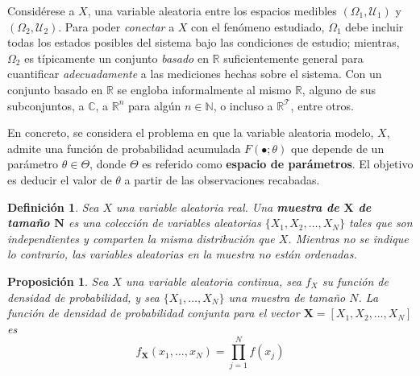 \documentclass[12pt,letterpaper]{book}
\newtheorem{definicion}{Definición}[chapter]
\newtheorem{proposicion}[teorema]{Proposición}
\newcommand{\R}{\mathbb{R}}
\newcommand{\C}{\mathbb{C}}
\newcommand{\N}{\mathbb{N}}
\begin{document}

Considérese a $X$, una variable aleatoria entre los espacios medibles $(\Omega_1,\mathcal{U}_1)$ y $(\Omega_2,\mathcal{U}_2)$. 
%
Para poder \textit{conectar} a $X$ con el fenómeno estudiado, $\Omega_1$ debe incluir todas los estados posibles del sistema bajo las condiciones de estudio; mientras, $\Omega_2$ es típicamente un conjunto \textit{basado} en $\R$ suficientemente general para cuantificar \textit{adecuadamente} a las mediciones hechas sobre el sistema.
%
Con un conjunto basado en $\R$ se engloba informalmente al mismo $\R$, alguno de sus subconjuntos, a $\C$, a $\R^n$ para algún $n\in \N$, o incluso a $\R^\mathcal{T}$, entre otros.

En concreto, se considera el problema en que la variable aleatoria modelo, $X$, admite una función de probabilidad acumulada $F(\bullet; \theta)$ que depende de un parámetro $\theta \in \Theta$, donde $\Theta$ es referido como \textbf{espacio de parámetros}.
%
El objetivo es deducir el valor de $\theta$ a partir de las observaciones recabadas.

\begin{definicion}
Sea $X$ una variable aleatoria real. Una \textbf{muestra de $\boldsymbol{X}$ de tamaño $\boldsymbol{N}$} es una colección de variables aleatorias $\{ X_1, X_2, \dots, X_N \}$ tales que son independientes y comparten la misma distribución que $X$.
%
Mientras no se indique lo contrario, las variables aleatorias en la muestra no están ordenadas.
\end{definicion}

\begin{proposicion}
Sea $X$ una variable aleatoria continua, sea $f_X$ su función de densidad de probabilidad, y sea $\{ X_1, \dots, X_N \}$ una muestra de tamaño $N$. 
%
La función de densidad de probabilidad conjunta para el vector $\boldsymbol{X}=[ X_1, X_2, \dots, X_N ]$ es
\begin{equation}
f_{\boldsymbol{X}}(x_1, \dots, x_N ) = \prod_{j=1}^{N} f(x_j)
\end{equation}
\label{oculto1}
\end{proposicion}
\end{document}
